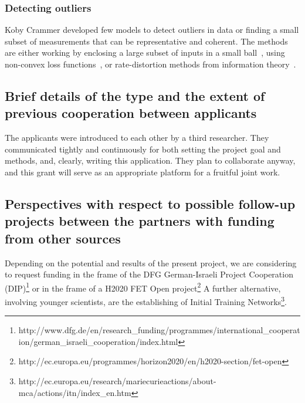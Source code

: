 \documentclass[12pt]{article}
\begin{document}
\subsubsection*{Detecting outliers}
Koby Crammer developed few models to detect outliers in data or finding a small subset of measurements that can be representative and coherent. The methods are either working by enclosing a large subset of inputs in a small ball~\cite{DBLP:conf/colt/CrammerS03}, using non-convex loss functions~\cite{CrammerCh04}, or rate-distortion methods from information theory~\cite{DBLP:conf/icml/CrammerTP08}.

\subsection*{Brief details of the type and the extent of previous cooperation between applicants}
The applicants were introduced to each other by a third researcher. They communicated tightly and continuously for both setting the project goal and methods, and, clearly, writing this application. They plan to collaborate anyway, and this grant will serve as an appropriate platform for a fruitful joint work.

\subsection*{Perspectives with respect to possible follow-up projects between the partners with funding from other sources}
Depending on the potential and results of the present project, we are considering to request funding in the frame of the DFG German-Israeli Project Cooperation (DIP)\footnote{http://www.dfg.de/en/research\_funding/programmes/international\_cooperation/german\_israeli\_cooperation/index.html} or in the frame of a H2020 FET Open project\footnote{http://ec.europa.eu/programmes/horizon2020/en/h2020-section/fet-open}
A further alternative, involving younger scientists, are the establishing of Initial Training Networks\footnote{http://ec.europa.eu/research/mariecurieactions/about-mca/actions/itn/index\_en.htm}.
\end{document}

